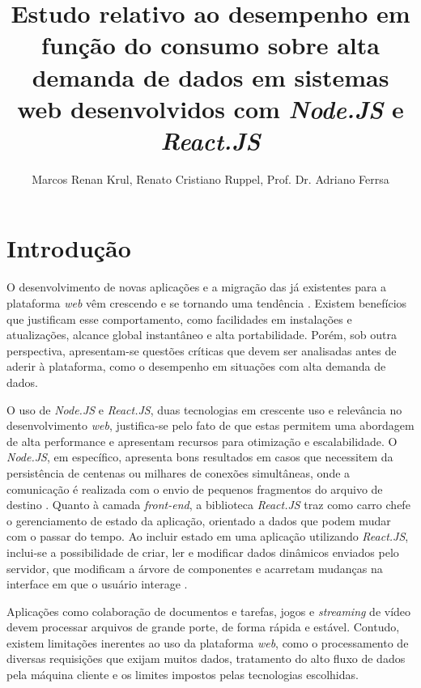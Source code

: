 \documentclass[12pt]{article}
\title{Estudo relativo ao desempenho em função do consumo sobre alta demanda de dados em sistemas web desenvolvidos com \textit{Node.JS} e \textit{React.JS}}
\author{Marcos Renan Krul\inst{1}, Renato Cristiano Ruppel\inst{1}, Prof. Dr. Adriano Ferrsa\inst{1}}
\begin{document}
 

\maketitle


\begin{resumo} 
\end{resumo}


\begin{abstract} 
\end{abstract}


\section{Introdução}

O desenvolvimento de novas aplicações e a migração das já existentes para a plataforma \textit{web} 
vêm crescendo e se tornando uma tendência \cite{SOUZAB}. Existem benefícios que justificam esse comportamento,
como facilidades em instalações e atualizações, alcance global instantâneo e alta portabilidade. Porém,
sob outra perspectiva, apresentam-se questões críticas que devem ser analisadas antes de aderir à plataforma, como
o desempenho em situações com alta demanda de dados.

O uso de \textit{Node.JS} e \textit{React.JS}, duas tecnologias em crescente uso e relevância no
desenvolvimento \textit{web}, justifica-se pelo fato de que estas permitem uma abordagem de alta
performance e apresentam recursos para otimização e escalabilidade. O \textit{Node.JS}, em específico, apresenta
bons resultados em casos que necessitem da persistência de centenas ou milhares de conexões
simultâneas, onde a comunicação é realizada com o envio de pequenos fragmentos do arquivo de destino
\cite[p. 112]{EJSMONT}. Quanto à camada \textit{front-end}, a biblioteca \textit{React.JS} traz como
carro chefe o gerenciamento de estado da aplicação, orientado a dados que podem mudar com o passar do tempo.
Ao incluir estado em uma aplicação utilizando \textit{React.JS}, inclui-se a possibilidade de criar, ler
e modificar dados dinâmicos enviados pelo servidor, que modificam a árvore de componentes e acarretam 
mudanças na interface em que o usuário interage \cite[p. 97]{BANKSEPORCELLO}.

Aplicações como colaboração de documentos e tarefas, jogos e \textit{streaming} de vídeo \cite{ZRHR} devem processar 
arquivos de grande porte, de forma rápida e estável. Contudo, existem limitações inerentes ao uso da 
plataforma \textit{web}, como o processamento de diversas requisições que exijam muitos dados, 
tratamento do alto fluxo de dados pela máquina cliente e os limites impostos pelas tecnologias escolhidas.
\end{document}
